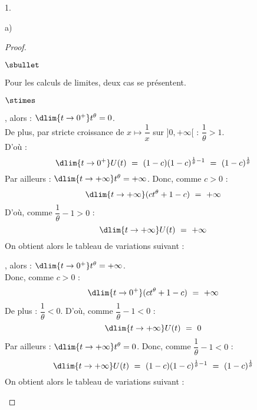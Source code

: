 \begin{noliste}{1.}
\begin{noliste}{a)}
\begin{proof}
\begin{noliste}{$\sbullet$}
    \item Pour les calculs de limites, deux cas se présentent.
    \begin{noliste}{$\stimes$}
      \item {}, alors :
      $\dlim{t\to 0^+} t^\theta = 0$. \\
      De plus, par stricte 
      croissance de $x\mapsto \dfrac{1}{x}$ sur $]0,+\infty[$ :
      $
       \dfrac{1}{\theta} >1
      $.\\[.2cm]
      D'où :
      \[
       \dlim{t\to 0^+} U(t) \ = \ (1-c)(1-c)^{\frac{1}{\theta}-1}
       \ = \ (1-c)^{\frac{1}{\theta}}
      \]
      Par ailleurs : $\dlim{t\to +\infty} t^\theta = +\infty$. 
      Donc, comme $c>0$ :
      \[
       \dlim{t\to +\infty} (ct^\theta +1-c) \ = \ +\infty
      \]
      D'où, comme $\dfrac{1}{\theta}-1>0$ :
      \[
       \dlim{t\to +\infty} U(t) \ = \ +\infty
      \]
      On obtient alors le tableau de variations suivant :
      
      \begin{center}
     \end{center}
     
     \item {}, alors :
      $\dlim{t\to 0^+} t^\theta = +\infty$. \\
      Donc, comme $c>0$ :
      \[
       \dlim{t\to 0^+} (ct^\theta +1-c) \ = \ +\infty
      \]
      De plus : $\dfrac{1}{\theta}<0$.
      D'où, comme $\dfrac{1}{\theta}-1<0$ :
      \[
       \dlim{t\to +\infty} U(t) \ = \ 0
      \]
      Par ailleurs : $\dlim{t\to +\infty} t^\theta = 0$. 
      Donc, comme $\dfrac{1}{\theta}-1<0$ :
      \[
       \dlim{t\to +\infty} U(t) \ = \ (1-c)(1-c)^{\frac{1}{\theta}-1}
       \ = \ (1-c)^{\frac{1}{\theta}}
      \]
      On obtient alors le tableau de variations suivant :
      
      \begin{center}
     \end{center}
     

\end{noliste}
\end{noliste}
\end{proof}
\end{noliste}
\end{noliste}

